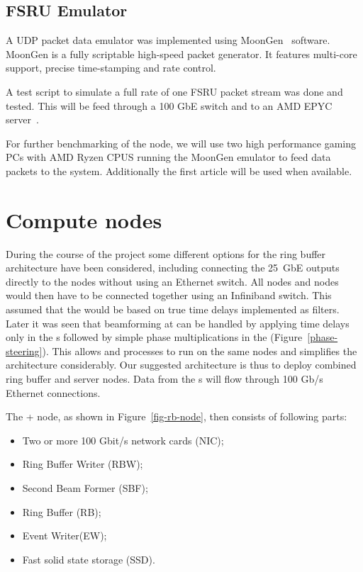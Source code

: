 \documentclass[12pt,a4paper]{article}
\begin{document}
\subsection{FSRU Emulator}
A UDP packet data emulator was implemented using MoonGen~\cite{moon-gen} software. 
MoonGen is a fully scriptable high-speed packet generator. It features multi-core support, precise time-stamping and rate control. 

A test script to simulate a full rate of one FSRU packet stream was done and tested. This will be feed through a 100 GbE switch and to an AMD EPYC server~\cite{amd-epyc}. 

For further benchmarking of the \SBF{} node, we will use two high performance gaming PCs with AMD Ryzen CPUS running the MoonGen emulator to feed data packets to the system. Additionally the \fsru{} first article will be used when available.

\section{Compute nodes}


During the course of the project some different options for the ring buffer architecture have been considered, including
connecting the \fsru{} 25~GbE outputs directly to the \RB nodes without using an Ethernet switch. 
All \RB{} nodes and \SBF{} nodes would then have to be connected together using an Infiniband switch.  This assumed that the \SBF{} would be based on true time delays implemented as \FIR{} filters. Later it was seen that beamforming at \NBW{} can be handled by applying time delays only in the \fsru{}s followed by simple phase multiplications in the \SBF{} (Figure~\ref{phase-steering}). This allows \RB and \SBF processes to run on the same nodes and simplifies the architecture considerably. Our suggested architecture is thus to deploy combined ring buffer and \SBF{} server nodes.  Data from the \fsru{}s will flow through 100 Gb/s Ethernet connections.

The \RB + \SBF node, as shown in Figure~\ref{fig-rb-node}, then consists of following parts:
\begin{itemize}
\item Two or more 100 Gbit/s network cards (NIC);
\item Ring Buffer Writer (RBW);
\item Second Beam Former  (SBF);
\item Ring Buffer (RB);
\item Event Writer(EW);
\item Fast solid state storage (SSD).
\end{itemize}
\end{document}
